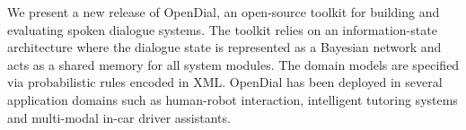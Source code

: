 We present a new release of OpenDial, an open-source toolkit for building and evaluating spoken dialogue systems. The toolkit relies on an information-state architecture where the dialogue state is represented as a Bayesian network and acts as a shared memory for all system modules. The domain models are specified via probabilistic rules encoded in XML. OpenDial has been deployed in several application domains such as human-robot interaction, intelligent tutoring systems and multi-modal in-car driver assistants.
